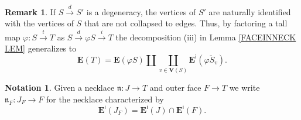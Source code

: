 \documentclass[a4paper,10pt]{article}%
\numberwithin{equation}{section}
\numberwithin{figure}{section}
\theoremstyle{definition} %
\newtheorem{remark}[equation]{Remark}%
\newtheorem{notation}[equation]{Notation}%
\newcommand{\1}{\ensuremath{\mathbbm 1}}%
\begin{document}
\begin{remark}
	If $S \xrightarrow{d} S'$
	is a degeneracy,
	the vertices of $S'$ are naturally identified with
	the vertices of $S$ that are not collapsed to edges.
	Thus, by factoring a tall map
	$\varphi \colon S \xrightarrow{t} T$ as
	$S \xrightarrow{d} \varphi S \xrightarrow{i} T$
	the decomposition (iii) in Lemma \ref{FACEINNECK LEM}
	generalizes to 
\begin{equation}\label{EDGEBREAK EQ}
	\boldsymbol{E}(T) = 
	\boldsymbol{E}(\varphi S) \amalg 
	\coprod_{v \in \boldsymbol{V}(S)}
	\boldsymbol{E}^{\mathsf{i}}(\overline{\varphi S_v}).
\end{equation}
\end{remark}



\begin{notation}
	Given a necklace
	$\mathfrak{n} \colon J \to T$
	and outer face $F \to T$
	we write 
	$\mathfrak{n}_F \colon J_F \to F$
	for the necklace characterized by
\[
	\boldsymbol{E}^{\mathsf{i}}(J_F)
	=
	\boldsymbol{E}^{\mathsf{i}}(J)
	\cap
	\boldsymbol{E}^{\mathsf{i}}(F).
\]
\end{notation}
\end{document}
